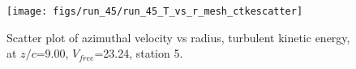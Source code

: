 \begin{figure}[H]
\centering
\texttt{[image: figs/run\_45/run\_45\_T\_vs\_r\_mesh\_ctkescatter]}
\caption{Scatter plot of azimuthal velocity vs radius, turbulent kinetic energy, at $z/c$=9.00, $V_{free}$=23.24, station 5.}
\label{fig:run_45_T_vs_r_mesh_ctkescatter}
\end{figure}


